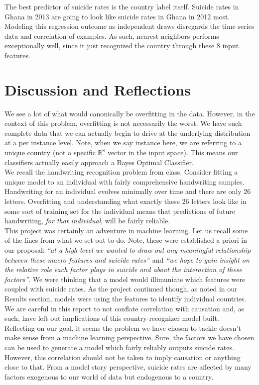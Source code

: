 \documentclass{article}
\begin{document}
\begin{multicols}{2}
The best predictor of suicide rates is the country label itself. Suicide rates in Ghana in 2013 are going to look like suicide rates in Ghana in 2012 most. Modeling this regression outcome as independent draws disregards the time series data and correlation of examples. As such, nearest neighbors performs exceptionally well, since it just recognized the country through these 8 input features. 

\section{Discussion and Reflections}

We see a lot of what would canonically be overfitting in the data. However, in the context of this problem, overfitting is not necessarily the worst. We have such complete data that we can actually begin to drive at the underlying distribution at a per instance level. Note, when we say instance here, we are referring to a unique country (not a specific $\mathbb{R}^8$ vector in the input space). This means our classifiers actually easily approach a Bayes Optimal Classifier. \\
We recall the handwriting recognition problem from class. Consider fitting a unique model to an individual with fairly comprehensive handwriting samples. Handwriting for an individual evolves minimally over time and there are only 26 letters. Overfitting and understanding what exactly these 26 letters look like in some sort of training set for the individual means that predictions of future handwriting, \textit{for that individual}, will be fairly reliable. \\
This project was certainly an adventure in machine learning. Let us recall some of the lines from what we set out to do. Note, these were established a priori in our proposal: \textit{``at a high-level we wanted to draw out any meaningful relationship between these macro features and suicide rates'}' and \textit{``we hope to gain insight on the
relative role each factor plays in suicide and about the interaction of these factors''}. We were thinking that a model would illimuniate which features were coupled with suicide rates. As the project continued though, as noted in our Results section, models were using the features to identify individual countries. We are careful in this report to not conflate correlation with causation and, as such, have left out implications of this country-recognizer model built. \\
Reflecting on our goal, it seems the problem we have chosen to tackle doesn't make sense from a machine learning perspective. Sure, the factors we have chosen can be used to generate a model which fairly reliably outputs suicide rates. However, this correlation should not be taken to imply causation or anything close to that. From a model story perspective, suicide rates are affected by many factors exogenous to our world of data but endogenous to a country. \\

\end{multicols}
\end{document}

